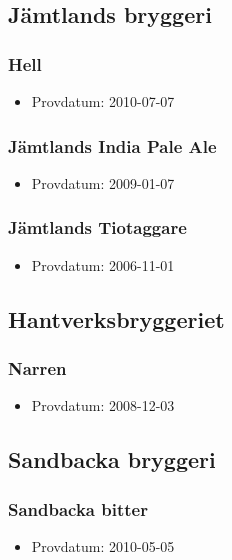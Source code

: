 \documentclass[11pt]{article}
\begin{document}
\subsection{Jämtlands bryggeri}
\label{sec:org697087d}
\subsubsection{Hell}
\label{sec:orgf3b0668}
\begin{itemize}
\item Provdatum: 2010-07-07
\end{itemize}
\subsubsection{Jämtlands India Pale Ale}
\label{sec:org181e848}
\begin{itemize}
\item Provdatum: 2009-01-07
\end{itemize}
\subsubsection{Jämtlands Tiotaggare}
\label{sec:org0a18927}
\begin{itemize}
\item Provdatum: 2006-11-01
\end{itemize}
\subsection{Hantverksbryggeriet}
\label{sec:orgba03726}
\subsubsection{Narren}
\label{sec:org9e55369}
\begin{itemize}
\item Provdatum: 2008-12-03
\end{itemize}
\subsection{Sandbacka bryggeri}
\label{sec:orgd1ee060}
\subsubsection{Sandbacka bitter}
\label{sec:orgd8e52b6}
\begin{itemize}
\item Provdatum: 2010-05-05
\end{itemize}
\end{document}

